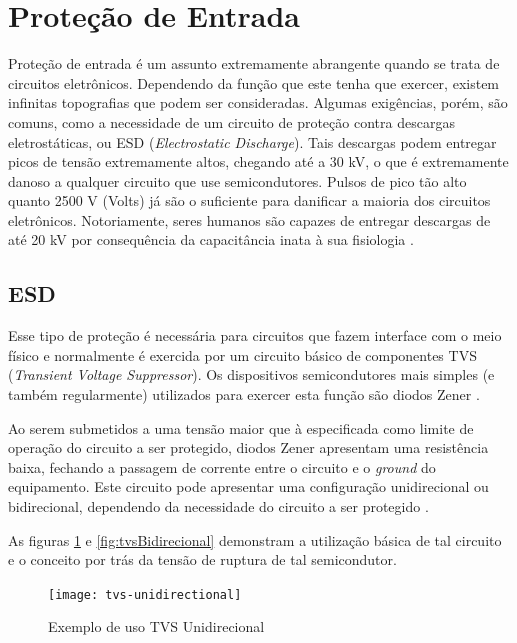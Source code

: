 \section{Proteção de Entrada}\label{sec:InputProtection}

Proteção de entrada é um assunto extremamente abrangente quando se trata de circuitos eletrônicos. Dependendo da função que este tenha que exercer, existem infinitas topografias que podem ser consideradas. Algumas exigências, porém, são comuns, como a necessidade de um circuito de proteção contra descargas eletrostáticas, ou \gls{ESD} (\textit{Electrostatic Discharge}). Tais descargas podem entregar picos de tensão extremamente altos, chegando até a 30 kV, o que é extremamente danoso a qualquer circuito que use semicondutores. Pulsos de pico tão alto quanto 2500 V (Volts) já são o suficiente para danificar a maioria dos circuitos eletrônicos. Notoriamente, seres humanos são capazes de entregar descargas de até 20 kV por consequência da capacitância inata à sua fisiologia \cite{ONsemicondTVS2}. 

    \subsection{ESD}\label{subsec:electrostaticDischarge}
    Esse tipo de proteção é necessária para circuitos que fazem interface com o meio físico e normalmente é exercida por um circuito básico de componentes \gls{TVS} (\textit{Transient Voltage Suppressor}). Os dispositivos semicondutores mais simples (e também regularmente) utilizados para exercer esta função são diodos Zener \cite{IPblog}.
    
    Ao serem submetidos a uma tensão maior que à especificada como limite de operação do circuito a ser protegido, diodos Zener apresentam uma resistência baixa, fechando a passagem de corrente entre o circuito e o \textit{ground} do equipamento. Este circuito pode apresentar uma configuração unidirecional ou bidirecional, dependendo da necessidade do circuito a ser protegido \cite{TIESD}.
    
    As figuras \ref{fig:tvsUnidirecional} e \ref{fig:tvsBidirecional} demonstram a utilização básica de tal circuito e o conceito por trás da tensão de ruptura de tal semicondutor.

    \begin{figure}[htb!]%
        \caption{Exemplo de uso TVS Unidirecional}%
        \label{fig:tvsUnidirecional}%
        \texttt{[image: tvs-unidirectional]}%
    \end{figure}

